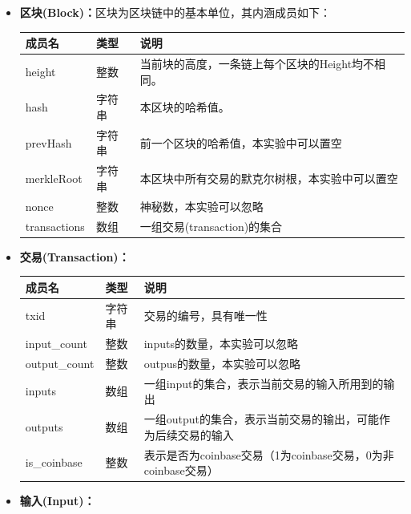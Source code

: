 \documentclass[10pt,a4paper]{article}
\begin{document}
    \begin{itemize}
        \item \textbf{区块(Block)：}区块为区块链中的基本单位，其内涵成员如下：
        \begin{table}[H]
            \centering
            \begin{tabular}{|l|l|l|}
            \hline
                成员名 & 类型 & 说明 \\ \hline
                height & 整数 & 当前块的高度，一条链上每个区块的Height均不相同。 \\ \hline
                hash & 字符串 & 本区块的哈希值。  \\ \hline
                prevHash & 字符串 & 前一个区块的哈希值，本实验中可以置空 \\ \hline
                merkleRoot & 字符串 & 本区块中所有交易的默克尔树根，本实验中可以置空 \\ \hline
                nonce & 整数 & 神秘数，本实验可以忽略  \\ \hline
                transactions & 数组 & 一组交易(transaction)的集合 \\ \hline
            \end{tabular}
        \end{table}
        \item \textbf{交易(Transaction)：}
        \begin{table}[H]
            \centering
            \begin{tabular}{|l|l|l|}
            \hline
                成员名 & 类型 & 说明 \\ \hline
                txid & 字符串 & 交易的编号，具有唯一性 \\ \hline
                input\_count & 整数 & inputs的数量，本实验可以忽略 \\ \hline
                output\_count & 整数 & outpus的数量，本实验可以忽略 \\ \hline
                inputs & 数组 & 一组input的集合，表示当前交易的输入所用到的输出 \\ \hline
                outputs & 数组 & 一组output的集合，表示当前交易的输出，可能作为后续交易的输入 \\ \hline
                is\_coinbase & 整数 & 表示是否为coinbase交易（1为coinbase交易，0为非coinbase交易） \\ \hline
            \end{tabular}
        \end{table}
        \item \textbf{输入(Input)：}

\end{itemize}
\end{document}
